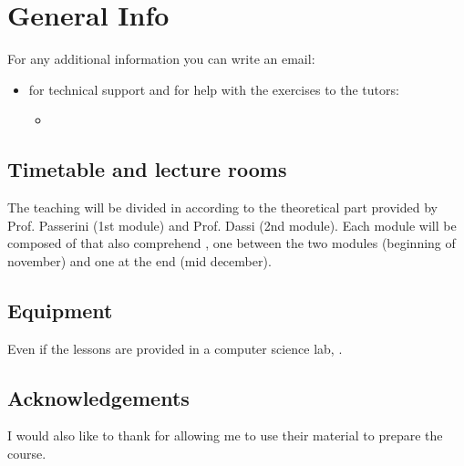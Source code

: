 \documentclass[letterpaper,10pt,english]{sphinxmanual}
\begin{document}
\sphinxstepscope




\chapter{General Info}
\label{\detokenize{index:General-Info}}
\sphinxAtStartPar
For any additional information you can write an email:
\begin{itemize}
\item {} 
\sphinxAtStartPar
for technical support and for help with the exercises to the tutors:
\begin{itemize}
\item {} 
\sphinxAtStartPar
{}

\end{itemize}

\end{itemize}


\section{Timetable and lecture rooms}
\label{\detokenize{index:Timetable-and-lecture-rooms}}
\sphinxAtStartPar
The teaching will be divided in  according to the theoretical part provided by Prof. Passerini (1st module) and Prof. Dassi (2nd module). Each module will be composed of  that also comprehend , one between the two modules (beginning of november) and one at the end (mid december).


\section{Equipment}
\label{\detokenize{index:Equipment}}
\sphinxAtStartPar
Even if the lessons are provided in a computer science lab, .


\section{Acknowledgements}
\label{\detokenize{index:Acknowledgements}}
\sphinxAtStartPar
I would also like to thank  for allowing me to use their material to prepare the course.
\end{document}
